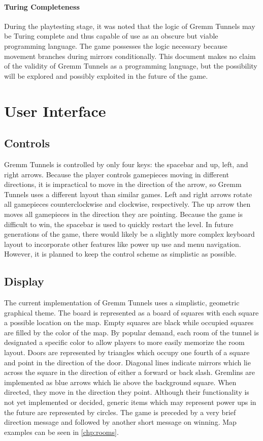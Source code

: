 \documentclass{scrreprt}
\begin{document}
				\subsubsection{Turing Completeness}
					During the playtesting stage, it was noted that the logic of Gremm Tunnels may be Turing complete and thus capable of use as an obscure but viable programming language. The game possesses the logic necessary because movement branches during mirrors conditionally. This document makes no claim of the validity of Gremm Tunnels as a programming language, but the possibility will be explored and possibly exploited in the future of the game.
	
	\chapter{User Interface}
		
		\section{Controls}
			Gremm Tunnels is controlled by only four keys: the spacebar and up, left, and right arrows. Because the player controls gamepieces moving in different directions, it is impractical to move in the direction of the arrow, so Gremm Tunnels uses a different layout than similar games. Left and right arrows rotate all gamepieces counterclockwise and clockwise, respectively. The up arrow then moves all gamepieces in the direction they are pointing. Because the game is difficult to win, the spacebar is used to quickly restart the level. In future generations of the game, there would likely be a slightly more complex keyboard layout to incorporate other features like power up use and menu navigation. However, it is planned to keep the control scheme as simplistic as possible. 
		
		\section{Display}
			The current implementation of Gremm Tunnels uses a simplistic, geometric graphical theme. The board is represented as a board of squares with each square a possible location on the map. Empty squares are black while occupied squares are filled by the color of the map. By popular demand, each room of the tunnel is designated a specific color to allow players to more easily memorize the room layout. Doors are represented by triangles which occupy one fourth of a square and point in the direction of the door. Diagonal lines indicate mirrors which lie across the square in the direction of either a forward or back slash. Gremlins are implemented as blue arrows which lie above the background square. When directed, they move in the direction they point. Although their functionality is not yet implemented or decided, generic items which may represent power ups in the future are represented by circles. The game is preceded by a very brief direction message and followed by another short message on winning. Map examples can be seen in \autoref{chp:rooms}.
		
\end{document}
